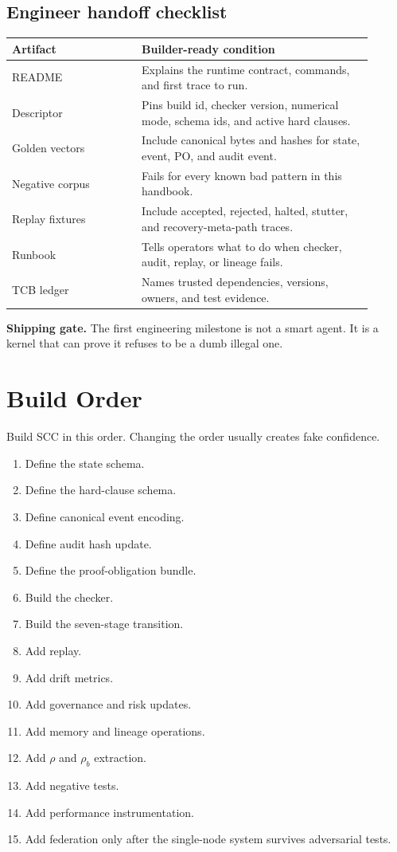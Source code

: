 \documentclass[11pt,oneside]{article}
\newenvironment{shipbox}{\begin{shaded}\noindent\textbf{Shipping gate.} }{\end{shaded}}
\begin{document}
\subsection{Engineer handoff checklist}
\begin{longtable}{@{}p{0.32\linewidth}p{0.58\linewidth}@{}}
\toprule
\textbf{Artifact} & \textbf{Builder-ready condition} \\
\midrule
README & Explains the runtime contract, commands, and first trace to run. \\
Descriptor & Pins build id, checker version, numerical mode, schema ids, and active hard clauses. \\
Golden vectors & Include canonical bytes and hashes for state, event, PO, and audit event. \\
Negative corpus & Fails for every known bad pattern in this handbook. \\
Replay fixtures & Include accepted, rejected, halted, stutter, and recovery-meta-path traces. \\
Runbook & Tells operators what to do when checker, audit, replay, or lineage fails. \\
TCB ledger & Names trusted dependencies, versions, owners, and test evidence. \\
\bottomrule
\end{longtable}

\begin{shipbox}
The first engineering milestone is not a smart agent. It is a kernel that can prove it refuses to be a dumb illegal one.
\end{shipbox}


\section{Build Order}
Build SCC in this order. Changing the order usually creates fake confidence.

\begin{enumerate}
\item Define the state schema.
\item Define the hard-clause schema.
\item Define canonical event encoding.
\item Define audit hash update.
\item Define the proof-obligation bundle.
\item Build the checker.
\item Build the seven-stage transition.
\item Add replay.
\item Add drift metrics.
\item Add governance and risk updates.
\item Add memory and lineage operations.
\item Add \(\rho\) and \(\rho_b\) extraction.
\item Add negative tests.
\item Add performance instrumentation.
\item Add federation only after the single-node system survives adversarial tests.
\end{enumerate}
\end{document}
